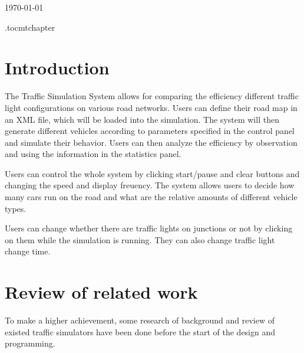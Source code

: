 \documentclass[a4paper,12pt]{article}
\begin{document}
\begin{titlepage}
{\large \today}\\[3cm] %




\vfill %

\end{titlepage}

\etocdepthtag.toc{mtchapter}
\tableofcontents

\newpage

\section{Introduction}
The Traffic Simulation System allows for comparing the efficiency different traffic light configurations on various road networks. Users can define their road map in an XML file, which will be loaded into the simulation. The system will then generate different vehicles according to parameters specified in the control panel and simulate their behavior. Users can then analyze the efficiency by observation and using the information in the statistics panel.

Users can control the whole system by clicking start/pause and clear buttons and changing the speed and display freuency. The system allows users to decide how many cars run on the road and what are the relative amounts of different vehicle types.

Users can change whether there are traffic lights on junctions or not by clicking on them while the simulation is running. They can also change traffic light change time.

\section{Review of related work}
To make a higher achievement, some research of background and review of existed traffic simulators have been done before the start of the design and programming.\\
\end{document}
